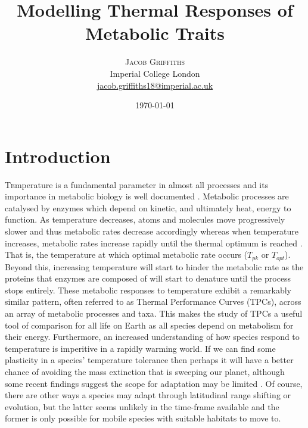 \documentclass[twoside,twocolumn]{article}
\title{Modelling Thermal Responses of Metabolic Traits}
\author{
\textsc{Jacob Griffiths} \\
\normalsize Imperial College London \\ 
\normalsize \href{mailto:jacob.griffiths18@imperial.ac.uk}{jacob.griffiths18@imperial.ac.uk}
}
\date{\today}
\begin{document}
\maketitle

\linenumbers
\section{Introduction}

\lettrine[nindent=0em,lines=3]{T}emperature is a fundamental parameter in
almost all processes and its importance in metabolic biology is well documented \citep{Montoya2012, Dell2011,DeLong2017}. 
Metabolic processes are catalysed by enzymes
which depend on kinetic, and ultimately heat, energy to function. As temperature
decreases, atoms and molecules move progressively slower and thus metabolic rates
decrease accordingly whereas when temperature increases, metabolic rates increase rapidly
until the thermal optimum is reached  \citep{DeLong2017, Dell2011}. That is, the temperature at which optimal
metabolic rate occurs ($T_{pk}$ or $T_{opt}$). Beyond this, increasing temperature
will start to hinder the metabolic rate as the proteins that enzymes are composed of 
will start to denature until the process stops entirely. These metabolic responses 
to temperature exhibit a remarkably similar pattern, often referred to as Thermal 
Performance Curves (TPCs), across an array of metabolic processes and taxa. This 
makes the study of TPCs a useful tool of comparison for all life on Earth as all
species depend on metabolism for their energy. Furthermore, an increased understanding
of how species respond to temperature is imperitive in a rapidly warming world. 
If we can find some plasticity in a species' temperature tolerance then perhaps it will
have a better chance of avoiding the mass extinction that is sweeping our planet,
although some recent findings suggest the scope for adaptation may be limited \citep{Tuzun2018}.
Of course, there are other ways a species may adapt through latitudinal range shifting 
or evolution, but the latter seems unlikely in the time-frame available and the former
is only possible for mobile species with suitable habitats to move to.
\end{document}
